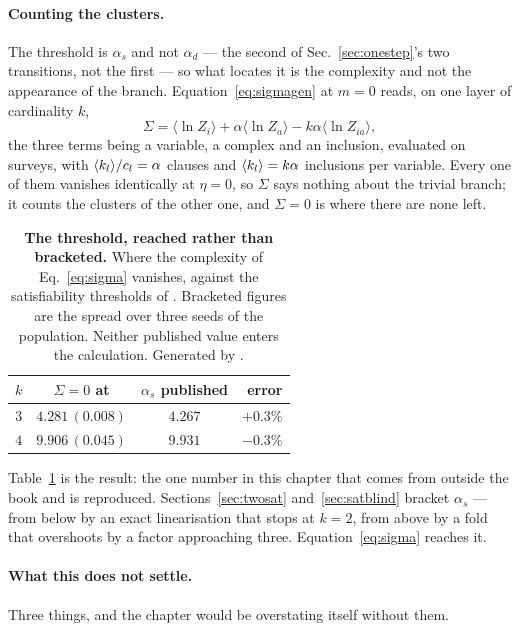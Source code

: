 \paragraph{Counting the clusters.} The threshold is $\alpha_{s}$ and not
$\alpha_{d}$ --- the second of Sec.~\ref{sec:onestep}'s two transitions, not the
first --- so what locates it is the complexity and not the appearance of the
branch. Equation~\eqref{eq:sigmagen} at $m=0$ reads, on one layer of cardinality
$k$,
\begin{equation}
  \Sigma=\bigl\langle\ln Z_{i}\bigr\rangle
        +\alpha\bigl\langle\ln Z_{a}\bigr\rangle
        -k\alpha\bigl\langle\ln Z_{ia}\bigr\rangle,
  \label{eq:sigma}
\end{equation}
the three terms being a variable, a complex and an inclusion, evaluated on
surveys, with $\langle k_{l} \rangle/c_{l}=\alpha$ clauses and $\langle k_{l} \rangle=k\alpha$
inclusions per variable. Every one of them vanishes
identically at $\eta=0$, so $\Sigma$ says nothing about the trivial branch; it
counts the clusters of the other one, and $\Sigma=0$ is where there are none
left.

\begin{table}[t]
\centering\small
\begin{tabular}{rccr}
\hline\hline
$k$ & $\Sigma=0$ at & $\alpha_{s}$ published & error\\
\hline
$3$ & $4.281\,(0.008)$ & $4.267$ & $+0.3\%$\\
$4$ & $9.906\,(0.045)$ & $9.931$ & $-0.3\%$\\
\hline\hline
\end{tabular}
\caption{\textbf{The threshold, reached rather than bracketed.} Where the
complexity of Eq.~\eqref{eq:sigma} vanishes, against the satisfiability
thresholds of \citet{montanari2008}. Bracketed figures are the spread over
three seeds of the population. Neither published value enters the calculation.
Generated by .}
\label{tab:satsp}
\end{table}

Table~\ref{tab:satsp} is the result: the one number in this chapter that comes
from outside the book and is reproduced. Sections~\ref{sec:twosat}
and~\ref{sec:satblind} bracket $\alpha_{s}$ --- from below by an exact
linearisation that stops at $k=2$, from above by a fold that overshoots by a
factor approaching three. Equation~\eqref{eq:sigma} reaches it.

\paragraph{What this does not settle.} Three things, and the chapter would be
overstating itself without them.

